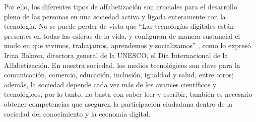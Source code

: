 \documentclass[spanish]{textolivre}
\begin{document}
Por ello, los diferentes tipos de alfabetización son cruciales para el desarrollo pleno de las personas en una sociedad activa y ligada enteramente con la tecnología. No se puede perder de vista que “Las tecnologías digitales están presentes en todas las esferas de la vida, y configuran de manera sustancial el modo en que vivimos, trabajamos, aprendemos y socializamos” \cite[párr. 4]{unesco_alfabetizacion_2017}, como lo expresó Irina Bokova, directora general de la UNESCO, el Día Internacional de la Alfabetización.
En nuestra sociedad, los medios tecnológicos son clave para la comunicación, comercio, educación, inclusión, igualdad y salud, entre otros; además, la sociedad depende cada vez más de los avances científicos y tecnológicos, por lo tanto, no basta con saber leer y escribir, también es necesario obtener competencias que aseguren la participación ciudadana dentro de la sociedad del conocimiento y la economía digital.

\printbibliography\label{sec-bib}
\end{document}
